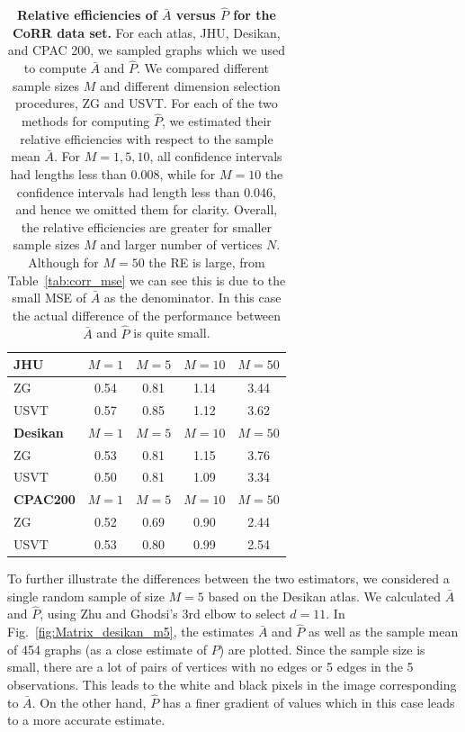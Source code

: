 \documentclass[10pt,letterpaper]{article}
\renewcommand{\hat}{\widehat}
\begin{document}
\begin{table}[!tb]
    \centering
\begin{tabular}{lcccc}\toprule
\multicolumn{1}{l}{\textbf{JHU}} & $M=1$  & $M=5$  & $M=10$ & $M=50$  \\\midrule
ZG      & 0.54 & 0.81 & 1.14 & 3.44  \\
USVT    & 0.57 & 0.85 & 1.12 & 3.62 \\\midrule
\multicolumn{1}{l}{\textbf{Desikan}} & $M=1$  & $M=5$  & $M=10$ & $M=50$  \\ \midrule
ZG      & 0.53 & 0.81 & 1.15 & 3.76 \\
USVT    & 0.50 & 0.81 & 1.09 & 3.34 \\\midrule
\multicolumn{1}{l}{\textbf{CPAC200}} & $M=1$  & $M=5$  & $M=10$ & $M=50$  \\\midrule
ZG      & 0.52 & 0.69 & 0.90 & 2.44 \\
USVT    & 0.53 & 0.80 & 0.99 & 2.54 \\\bottomrule
\end{tabular}
    \caption{{\bf Relative efficiencies of $\bar{A}$ versus $\hat{P}$ for the CoRR data set.}
    For each atlas, JHU, Desikan, and CPAC 200, we sampled graphs which we used to compute $\bar{A}$ and $\hat{P}$.
     We compared different sample sizes $M$ and different dimension selection procedures, ZG and USVT.
    For each of the two methods for computing $\hat{P}$, we estimated their relative efficiencies with respect to the sample mean $\bar{A}$.
    For $M = 1, 5, 10$, all confidence intervals had lengths less than $0.008$, while for $M=10$ the confidence intervals had length less than $0.046$, and hence we omitted them for clarity.
    Overall, the relative efficiencies are greater for smaller sample sizes $M$ and larger number of vertices $N$. Although for $M=50$ the RE is large, from Table~\ref{tab:corr_mse} we can see this is due to the small MSE of $\bar{A}$ as the denominator. In this case the actual difference of the performance between $\bar{A}$ and $\hat{P}$ is quite small.
    } 
    \label{tab:corr_re}
\end{table}





To further illustrate the differences between the two estimators, we considered a single random sample of size $M=5$ based on the Desikan atlas.
We calculated $\bar{A}$ and $\hat{P}$, using  Zhu and Ghodsi's 3rd elbow to select $d=11$. 
In Fig.~\ref{fig:Matrix_desikan_m5}, the estimates $\bar{A}$ and $\hat{P}$ as well as the sample mean of 454 graphs (as a close estimate of $P$) are plotted. 
Since the sample size is small, there are a lot of pairs of vertices with no edges or 5 edges in the 5 observations.
This leads to the white and black pixels in the image corresponding to $\bar{A}$.
On the other hand, $\hat{P}$ has a finer gradient of values which in this case leads to a more accurate estimate.
\end{document}
